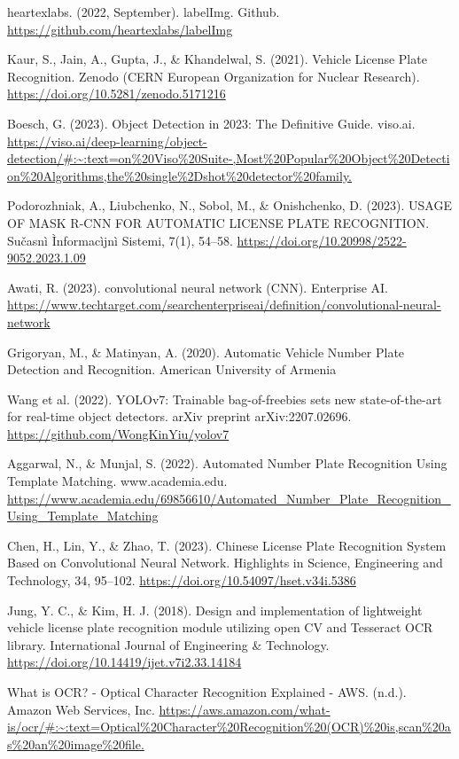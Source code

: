 \documentclass[conference]{IEEEtran}
\begin{document}
\begin{thebibliography}{00}
 heartexlabs. (2022, September). labelImg. Github. \url{https://github.com/heartexlabs/labelImg}

 Kaur, S., Jain, A., Gupta, J., \& Khandelwal, S. (2021). Vehicle License Plate Recognition. Zenodo (CERN European Organization for Nuclear Research). \url{https://doi.org/10.5281/zenodo.5171216}

 Boesch, G. (2023). Object Detection in 2023: The Definitive Guide. viso.ai. 
\url{https://viso.ai/deep-learning/object-detection/#:~:text=on%20Viso%20Suite-,Most%20Popular%20Object%20Detection%20Algorithms,the%20single%2Dshot%20detector%20family.}

 Podorozhniak, A., Liubchenko, N., Sobol, M., \& Onishchenko, D. (2023). USAGE OF MASK R-CNN FOR AUTOMATIC LICENSE PLATE RECOGNITION. Sučasnì Ìnformacìjnì Sistemi, 7(1), 54–58. \url{https://doi.org/10.20998/2522-9052.2023.1.09}

 Awati, R. (2023). convolutional neural network (CNN). Enterprise AI. \url{https://www.techtarget.com/searchenterpriseai/definition/convolutional-neural-network}

 Grigoryan, M., \& Matinyan, A. (2020). Automatic Vehicle Number Plate Detection and Recognition. American University of Armenia


 Wang et al. (2022). YOLOv7: Trainable bag-of-freebies sets new state-of-the-art for real-time object detectors. arXiv preprint arXiv:2207.02696. 
\url{https://github.com/WongKinYiu/yolov7}

 Aggarwal, N., \& Munjal, S. (2022). Automated Number Plate Recognition Using Template Matching. www.academia.edu. \url{https://www.academia.edu/69856610/Automated_Number_Plate_Recognition_Using_Template_Matching}

 Chen, H., Lin, Y., \& Zhao, T. (2023). Chinese License Plate Recognition System Based on Convolutional Neural Network. Highlights in Science, Engineering and Technology, 34, 95–102. \url{https://doi.org/10.54097/hset.v34i.5386}

 Jung, Y. C., \& Kim, H. J. (2018). Design and implementation of lightweight vehicle license plate recognition module utilizing open CV and Tesseract OCR library. International Journal of Engineering \& Technology. \url{https://doi.org/10.14419/ijet.v7i2.33.14184}

 What is OCR? - Optical Character Recognition Explained - AWS. (n.d.). Amazon Web Services, Inc. \url{https://aws.amazon.com/what-is/ocr/#:~:text=Optical%20Character%20Recognition%20(OCR)%20is,scan\%20as%20an%20image%20file.}


\end{thebibliography}
\end{document}
